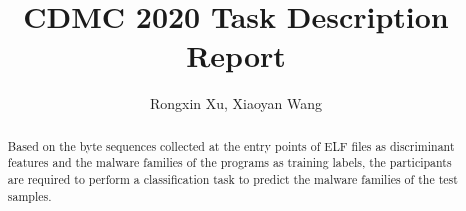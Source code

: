 \documentclass{amsart}
\begin{document}
%
%
\title[Tulip Academy]{CDMC 2020 Task Description Report}%

\author{Rongxin Xu, Xiaoyan Wang}
\address[A.~1]{School of Business Administration,\\ 
Hunan University, Changsha 410012, China}%

%
%
\date{\gitAuthorDate}%

\begin{abstract}
Based on the byte sequences collected at the entry points of ELF files as discriminant features and the malware families of the programs as training labels, the participants are required to perform a classification task to predict the malware families of the test samples.  
\end{abstract}

\maketitle
\tableofcontents

\newpage



\newpage



\listoftodos
\end{document}
